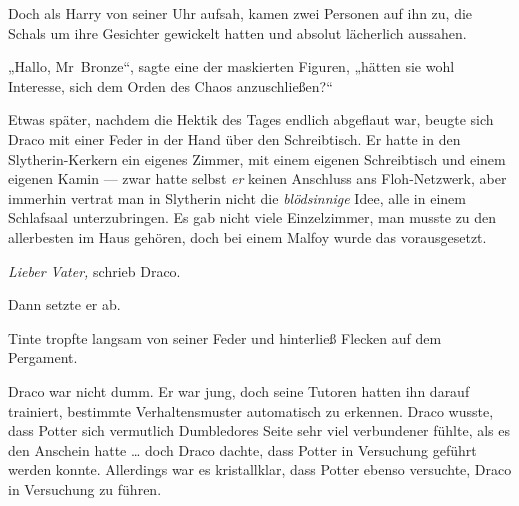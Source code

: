 Doch als Harry von seiner Uhr aufsah, kamen zwei Personen auf ihn zu, die Schals um ihre Gesichter gewickelt hatten und absolut lächerlich aussahen.

„Hallo, Mr~Bronze“, sagte eine der maskierten Figuren, „hätten sie wohl Interesse, sich dem Orden des Chaos anzuschließen?“


Etwas später, nachdem die Hektik des Tages endlich abgeflaut war, beugte sich Draco mit einer Feder in der Hand über den Schreibtisch. Er hatte in den Slytherin-Kerkern ein eigenes Zimmer, mit einem eigenen Schreibtisch und einem eigenen Kamin — zwar hatte selbst \emph{er} keinen Anschluss ans Floh-Netzwerk, aber immerhin vertrat man in Slytherin nicht die \emph{blödsinnige} Idee, alle in einem Schlafsaal unterzubringen. Es gab nicht viele Einzelzimmer, man musste zu den allerbesten im Haus gehören, doch bei einem Malfoy wurde das vorausgesetzt.

\emph{Lieber Vater,} schrieb Draco.

Dann setzte er ab.

Tinte tropfte langsam von seiner Feder und hinterließ Flecken auf dem Pergament.

Draco war nicht dumm. Er war jung, doch seine Tutoren hatten ihn darauf trainiert, bestimmte Verhaltensmuster automatisch zu erkennen. Draco wusste, dass Potter sich vermutlich Dumbledores Seite sehr viel verbundener fühlte, als es den Anschein hatte … doch Draco dachte, dass Potter in Versuchung geführt werden konnte. Allerdings war es kristallklar, dass Potter ebenso versuchte, Draco in Versuchung zu führen.

